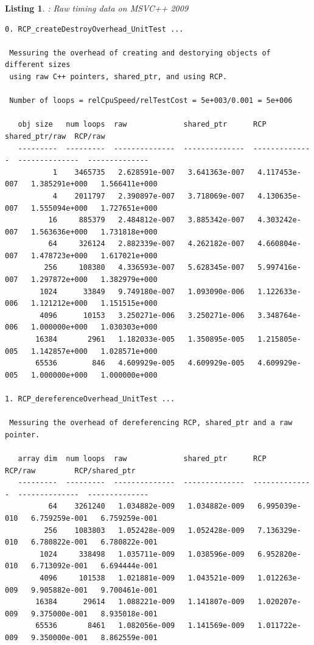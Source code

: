 \documentclass[pdf,ps2pdf,11pt]{SANDreport}
\newtheorem{listing}{Listing}
\begin{document}
{}\begin{listing}: Raw {} timing data on MSVC++ 2009
\label{listing:RCP-MSVC-Timings}
{\scriptsize\begin{verbatim}
0. RCP_createDestroyOverhead_UnitTest ... 
 
 Messuring the overhead of creating and destorying objects of different sizes
 using raw C++ pointers, shared_ptr, and using RCP.
 
 Number of loops = relCpuSpeed/relTestCost = 5e+003/0.001 = 5e+006
 
   obj size   num loops  raw             shared_ptr      RCP             shared_ptr/raw  RCP/raw       
   ---------  ---------  --------------  --------------  --------------  --------------  --------------
           1    3465735   2.628591e-007   3.641363e-007   4.117453e-007   1.385291e+000   1.566411e+000
           4    2011797   2.390897e-007   3.718069e-007   4.130635e-007   1.555094e+000   1.727651e+000
          16     885379   2.484812e-007   3.885342e-007   4.303242e-007   1.563636e+000   1.731818e+000
          64     326124   2.882339e-007   4.262182e-007   4.660804e-007   1.478723e+000   1.617021e+000
         256     108380   4.336593e-007   5.628345e-007   5.997416e-007   1.297872e+000   1.382979e+000
        1024      33849   9.749180e-007   1.093090e-006   1.122633e-006   1.121212e+000   1.151515e+000
        4096      10153   3.250271e-006   3.250271e-006   3.348764e-006   1.000000e+000   1.030303e+000
       16384       2961   1.182033e-005   1.350895e-005   1.215805e-005   1.142857e+000   1.028571e+000
       65536        846   4.609929e-005   4.609929e-005   4.609929e-005   1.000000e+000   1.000000e+000

1. RCP_dereferenceOverhead_UnitTest ... 
 
 Messuring the overhead of dereferencing RCP, shared_ptr and a raw pointer.
 
   array dim  num loops  raw             shared_ptr      RCP             RCP/raw         RCP/shared_ptr
   ---------  ---------  --------------  --------------  --------------  --------------  --------------
          64    3261240   1.034882e-009   1.034882e-009   6.995039e-010   6.759259e-001   6.759259e-001
         256    1083803   1.052428e-009   1.052428e-009   7.136329e-010   6.780822e-001   6.780822e-001
        1024     338498   1.035711e-009   1.038596e-009   6.952820e-010   6.713092e-001   6.694444e-001
        4096     101538   1.021881e-009   1.043521e-009   1.012263e-009   9.905882e-001   9.700461e-001
       16384      29614   1.088221e-009   1.141807e-009   1.020207e-009   9.375000e-001   8.935018e-001
       65536       8461   1.082056e-009   1.141569e-009   1.011722e-009   9.350000e-001   8.862559e-001


\end{verbatim}}
\end{listing}
\end{document}
